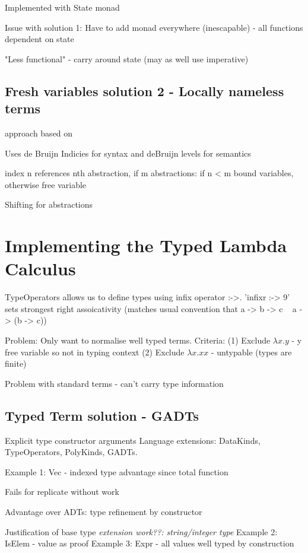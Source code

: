 \documentclass{article}
\begin{document}
Implemented with State monad

Issue with solution 1: Have to add monad everywhere (inescapable) - all functions dependent on state

"Less functional" - carry around state (may as well use imperative)

\subsection{Fresh variables solution 2 - Locally nameless terms}
approach based on \cite{deBruijn}

Uses de Bruijn Indicies for syntax and deBruijn levels for semantics

index n references nth abstraction,
if m abstractions: if n < m bound variables, otherwise free variable

Shifting for abstractions

\section{Implementing the Typed Lambda Calculus}

TypeOperators allows us to define types using infix operator :->.
'infixr :-> 9' sets strongest right assoicativity (matches usual convention that a -> b -> c ~ a -> (b -> c))

Problem: Only want to normalise well typed terms.
Criteria: 
(1) Exclude $\lambda x . y$ - y free variable so not in typing context
(2) Exclude $\lambda x.xx$ - untypable (types are finite)

Problem with standard terms - can't carry type information

\subsection{Typed Term solution - GADTs}

\cite{GADTs}
Explicit type constructor arguments
Language extensions:
DataKinds, TypeOperators, PolyKinds, GADTs.

Example 1: Vec - indexed type advantage since total function

Fails for replicate without work \cite{DependentHaskell}

Advantage over ADTs: type refinement by constructor

Justification of base type \textit{extension work??: string/integer type}
Example 2: IsElem - value as proof
Example 3: Expr - all values well typed by construction
\end{document}
